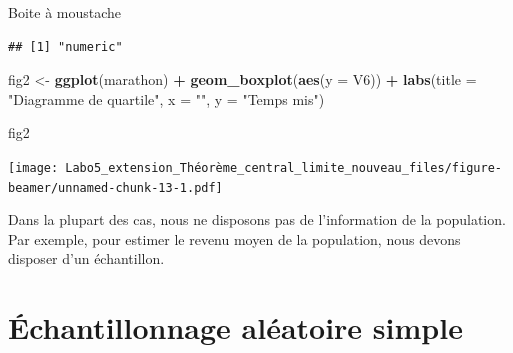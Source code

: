 \documentclass[ignorenonframetext,]{beamer}
\newenvironment{Shaded}{\begin{snugshade}}{\end{snugshade}}
\newcommand{\KeywordTok}[1]{\textcolor[rgb]{0.13,0.29,0.53}{\textbf{#1}}}
\newcommand{\DataTypeTok}[1]{\textcolor[rgb]{0.13,0.29,0.53}{#1}}
\newcommand{\StringTok}[1]{\textcolor[rgb]{0.31,0.60,0.02}{#1}}
\newcommand{\OperatorTok}[1]{\textcolor[rgb]{0.81,0.36,0.00}{\textbf{#1}}}
\newcommand{\NormalTok}[1]{#1}
\begin{document}
\begin{frame}[fragile]{Boite à moustache}

\begin{Shaded}
\end{Shaded}

\begin{verbatim}
## [1] "numeric"
\end{verbatim}

\begin{Shaded}
\begin{Highlighting}[]
\NormalTok{fig2 <-}\StringTok{ }
\StringTok{  }\KeywordTok{ggplot}\NormalTok{(marathon) }\OperatorTok{+}
\StringTok{  }\KeywordTok{geom_boxplot}\NormalTok{(}\KeywordTok{aes}\NormalTok{(}\DataTypeTok{y =}\NormalTok{ V6)) }\OperatorTok{+}
\StringTok{  }\KeywordTok{labs}\NormalTok{(}\DataTypeTok{title =} \StringTok{"Diagramme de quartile"}\NormalTok{,}
       \DataTypeTok{x =} \StringTok{""}\NormalTok{,}
       \DataTypeTok{y =} \StringTok{"Temps mis"}\NormalTok{)}
\end{Highlighting}
\end{Shaded}

\begin{Shaded}
\begin{Highlighting}[]
\NormalTok{fig2}
\end{Highlighting}
\end{Shaded}

\texttt{[image: Labo5\_extension\_Théorème\_central\_limite\_nouveau\_files/figure-beamer/unnamed-chunk-13-1.pdf]}

Dans la plupart des cas, nous ne disposons pas de l'information de la
population. Par exemple, pour estimer le revenu moyen de la population,
nous devons disposer d'un échantillon.

\end{frame}

\section{Échantillonnage aléatoire
simple}\label{uxe9chantillonnage-aluxe9atoire-simple}
\end{document}

